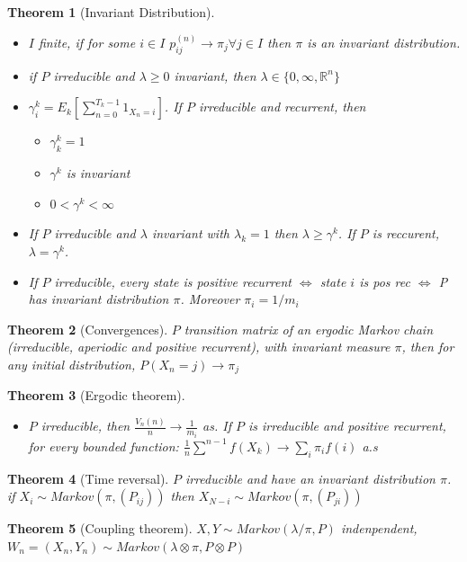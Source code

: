 \documentclass{article}
\newtheorem{theorem}{Theorem}
\begin{document}
\begin{theorem}[Invariant Distribution]
  \begin{itemize}
  \item $I$ finite, if for some $i \in I$ $p_{ij}^{(n)} \rightarrow \pi_j \forall j \in I$ then $\pi$ is an invariant distribution.
  \item if $P$ irreducible and $\lambda \ge 0$ invariant, then $\lambda \in \{0, \infty, \mathbb R^n\}$
  \item $\gamma_i^k = E_k [\sum^{T_k-1}_{n = 0} 1_{X_n = i}]$.
    If $P$ irreducible and recurrent, then
    \begin{itemize}
    \item $\gamma_k^k = 1$
    \item $\gamma^k$ is invariant
    \item $0 < \gamma^k < \infty$
    \end{itemize}
  \item If $P$ irreducible and $\lambda$ invariant with $\lambda_k = 1$ then $\lambda \ge \gamma^k$. If $P$ is reccurent, $\lambda = \gamma^k$.
  \item If $P$ irreducible, every state is positive recurrent $\iff$ state $i$ is pos rec $\iff$ P has invariant distribution $\pi$. Moreover $\pi_i = 1/m_i$
  \end{itemize}
\end{theorem}
\begin{theorem}[Convergences]
  $P$ transition matrix of an ergodic Markov chain (irreducible, aperiodic and positive recurrent), with invariant measure $\pi$, then for any initial distribution, $P(X_n = j) \rightarrow \pi_j$
\end{theorem}
\begin{theorem}[Ergodic theorem]
  \begin{itemize}
  \item $P$ irreducible, then $\frac{V_n(n)}{n} \rightarrow \frac{1}{m_i}$ as.
    If $P$ is irreducible and positive recurrent, for every bounded function:
    $\frac{1}{n} \sum^{n-1} f(X_k) \rightarrow \sum_i \pi_i f(i)$ a.s 
  \end{itemize}

\end{theorem}
\begin{theorem}[Time reversal]
  $P$ irreducible and have an invariant distribution $\pi$.
  if $X_i \sim Markov(\pi, (P_{ij}))$ then $X_{N-i} \sim Markov(\pi, (P_{ji}))$
\end{theorem}
\begin{theorem}[Coupling theorem]
  $X, Y \sim Markov(\lambda / \pi, P)$ indenpendent, $W_n = (X_n, Y_n) \sim Markov(\lambda \otimes \pi, P \otimes P)$
\end{theorem}
\end{document}
